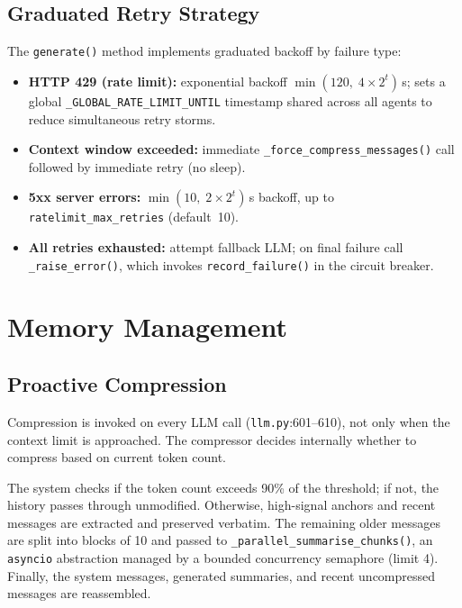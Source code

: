 \documentclass[12pt, a4paper, oneside, openany]{book}
\newcommand{\code}[1]{\texttt{#1}}
\newcommand{\file}[1]{\texttt{#1}}
\begin{document}
\subsection{Graduated Retry Strategy}

The \code{generate()} method implements graduated backoff by failure type:
\begin{itemize}[leftmargin=*]
  \item \textbf{HTTP 429 (rate limit):} exponential backoff
    $\min(120,\; 4 \times 2^t)$\,s; sets a global
    \code{\_GLOBAL\_RATE\_LIMIT\_UNTIL} timestamp shared across all
    agents to reduce simultaneous retry storms.
  \item \textbf{Context window exceeded:} immediate
    \code{\_force\_compress\_messages()} call followed by immediate
    retry (no sleep).
  \item \textbf{5xx server errors:} $\min(10,\; 2 \times 2^t)$\,s
    backoff, up to \code{ratelimit\_max\_retries} (default~10).
  \item \textbf{All retries exhausted:} attempt fallback LLM; on
    final failure call \code{\_raise\_error()}, which invokes
    \code{record\_failure()} in the circuit breaker.
\end{itemize}



\section{Memory Management}
\label{sec:memory}

\subsection{Proactive Compression}

Compression is invoked on every LLM call (\file{llm.py}:601--610),
not only when the context limit is approached.  The compressor
decides internally whether to compress based on current token count.


The system checks if the token count exceeds 90\% of the threshold; if not, the history passes through unmodified. Otherwise, high-signal anchors and recent messages are extracted and preserved verbatim. The remaining older messages are split into blocks of 10 and passed to \code{\_parallel\_summarise\_chunks()}, an \code{asyncio} abstraction managed by a bounded concurrency semaphore (limit 4). Finally, the system messages, generated summaries, and recent uncompressed messages are reassembled.
\end{document}
